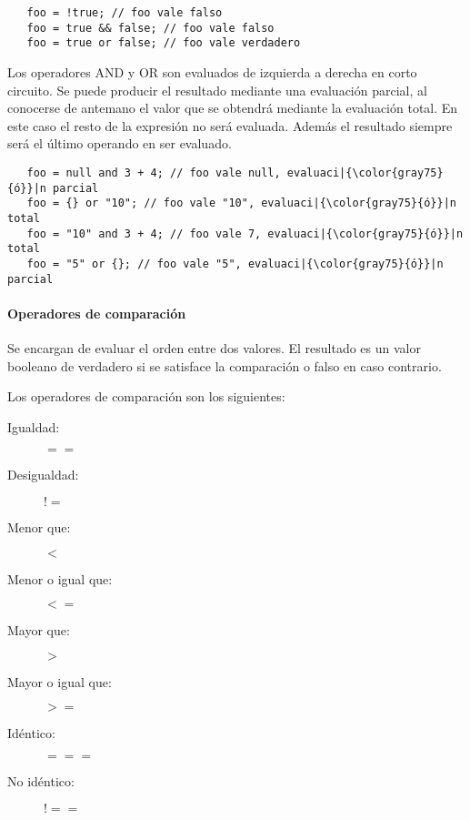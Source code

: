 \begin{lstlisting}
   foo = !true; // foo vale falso
   foo = true && false; // foo vale falso
   foo = true or false; // foo vale verdadero
\end{lstlisting} 


Los operadores AND y OR son evaluados de izquierda a derecha en corto circuito. Se puede producir el resultado mediante una evaluación parcial, al conocerse de antemano el 
valor que se obtendrá mediante la evaluación total. En este caso el resto de la expresión no será evaluada. Además el resultado siempre será el último operando en ser evaluado. \\
 
\begin{lstlisting}
   foo = null and 3 + 4; // foo vale null, evaluaci|{\color{gray75}{ó}}|n parcial 
   foo = {} or "10"; // foo vale "10", evaluaci|{\color{gray75}{ó}}|n total
   foo = "10" and 3 + 4; // foo vale 7, evaluaci|{\color{gray75}{ó}}|n total
   foo = "5" or {}; // foo vale "5", evaluaci|{\color{gray75}{ó}}|n parcial
\end{lstlisting} 



\paragraph{Operadores de comparación}\label{sec:op_cmp}
Se encargan de evaluar el orden entre dos valores. El resultado es un valor booleano de verdadero si se satisface la comparación o falso en caso contrario.

Los operadores de comparación son los siguientes:

\begin{description}
\item [Igualdad:] $==$
\item [Desigualdad:] $!=$
\item [Menor que:] $<$
\item [Menor o igual que:] $<=$
\item [Mayor que:] $>$
\item [Mayor o igual que:] $>=$
\item [Idéntico:] $===$
\item [No idéntico:] $!==$
\end{description} 


